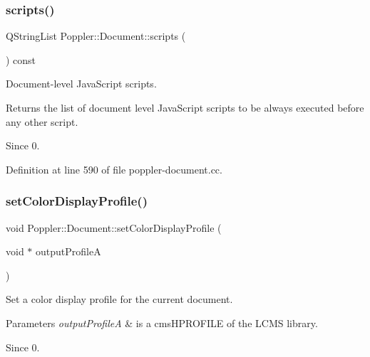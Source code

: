 \mbox{\label{class_poppler_1_1_document_aed91a0b3de99b9e8f951afea0ad8fd60}} 
\subsubsection{\texorpdfstring{scripts()}{scripts()}}
{\footnotesize\ttfamily Q\+String\+List Poppler\+::\+Document\+::scripts (\begin{DoxyParamCaption}{ }\end{DoxyParamCaption}) const}

Document-\/level Java\+Script scripts.

Returns the list of document level Java\+Script scripts to be always executed before any other script.

\begin{DoxySince}{Since}
0. 
\end{DoxySince}


Definition at line 590 of file poppler-\/document.\+cc.

\mbox{\label{class_poppler_1_1_document_a8b4dd39c8b59c19ab935d772e067f0c4}} 
\subsubsection{\texorpdfstring{set\+Color\+Display\+Profile()}{setColorDisplayProfile()}}
{\footnotesize\ttfamily void Poppler\+::\+Document\+::set\+Color\+Display\+Profile (\begin{DoxyParamCaption}\item[{void $\ast$}]{output\+ProfileA }\end{DoxyParamCaption})}

Set a color display profile for the current document.


\begin{DoxyParams}{Parameters}
{\em output\+ProfileA} & is a {\ttfamily cms\+H\+P\+R\+O\+F\+I\+LE} of the L\+C\+MS library.\\
\hline
\end{DoxyParams}
\begin{DoxySince}{Since}
0. 
\end{DoxySince}


